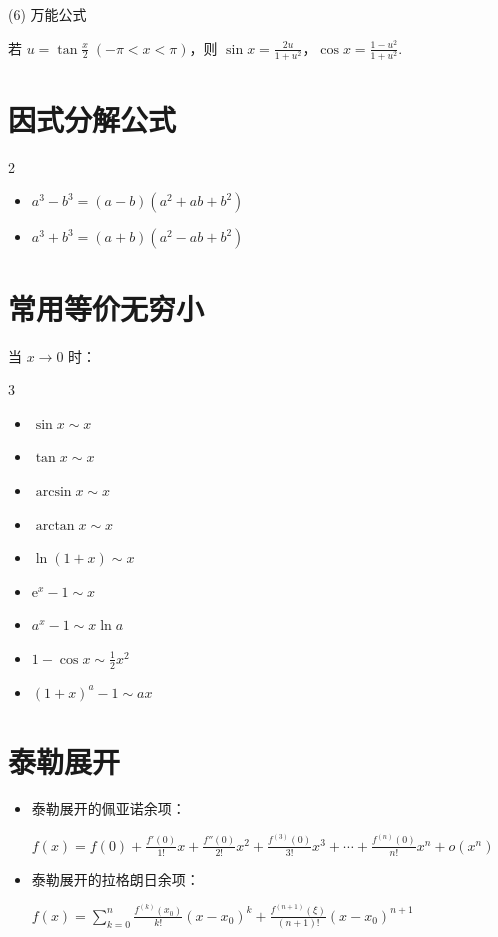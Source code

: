 \documentclass[lang=cn,math=mtpro2,10pt,scheme=chinese,black]{elegantbook}
\begin{document}
\vspace{1em}

(6) 万能公式

若 $u = \tan \frac{x}{2} \; (-\pi < x < \pi)$，则 $\sin x = \displaystyle \frac{2u}{1+u^2}$，$\cos x = \displaystyle \frac{1-u^2}{1+u^2}$.

\section{因式分解公式}

\begin{multicols}{2}
\begin{itemize}
    \item \( a^3 - b^3 = (a - b)(a^2 + ab + b^2) \)
    \item \( a^3 + b^3 = (a + b)(a^2 - ab + b^2) \)
\end{itemize}
\end{multicols}

\section{常用等价无穷小}

当 \(x \to 0\) 时：
\begin{multicols}{3}
\begin{itemize}
    \item \( \displaystyle \sin x \sim x \)
    \item \( \displaystyle \tan x \sim x \)
    \item \( \displaystyle \arcsin x \sim x \)
    \item \( \displaystyle \arctan x \sim x \)
    \item \( \displaystyle \ln(1+x) \sim x \)
    \item \( \displaystyle \mathrm{e}^x - 1 \sim x \)
    \item \( \displaystyle a^x - 1 \sim x \ln a \)
    \item \( \displaystyle 1 - \cos x \sim \frac{1}{2}x^2 \)
    \item \( \displaystyle (1+x)^a - 1 \sim ax \)
\end{itemize}
\end{multicols}

\section{泰勒展开}
\begin{itemize}
    \item 泰勒展开的佩亚诺余项：

\( \displaystyle f(x) = f(0) + \frac{f'(0)}{1!}x + \frac{f''(0)}{2!}x^2 + \frac{f^{(3)}(0)}{3!}x^3 + \cdots + \frac{f^{(n)}(0)}{n!}x^n + o(x^n) \)
    \item 泰勒展开的拉格朗日余项：
    
\( \displaystyle f(x) = \sum_{k=0}^{n} \frac{f^{(k)}(x_0)}{k!} (x - x_0)^k + \frac{f^{(n+1)}(\xi)}{(n+1)!} (x - x_0)^{n+1}\)
\end{itemize}
\end{document}
